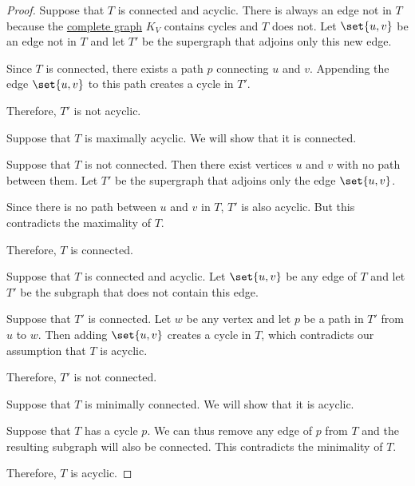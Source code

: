 \begin{proof}
   Suppose that \( T \) is connected and acyclic. There is always an edge not in \( T \) because the \hyperref[ex:complete_graph]{complete graph} \( K_V \) contains cycles and \( T \) does not. Let \( \set{ u, v } \) be an edge not in \( T \) and let \( T' \) be the supergraph that adjoins only this new edge.

  Since \( T \) is connected, there exists a path \( p \) connecting \( u \) and \( v \). Appending the edge \( \set{ u, v } \) to this path creates a cycle in \( T' \).

  Therefore, \( T' \) is not acyclic.

   Suppose that \( T \) is maximally acyclic. We will show that it is connected.

  Suppose that \( T \) is not connected. Then there exist vertices \( u \) and \( v \) with no path between them. Let \( T' \) be the supergraph that adjoins only the edge \( \set{ u, v } \).

  Since there is no path between \( u \) and \( v \) in \( T \), \( T' \) is also acyclic. But this contradicts the maximality of \( T \).

  Therefore, \( T \) is connected.

   Suppose that \( T \) is connected and acyclic. Let \( \set{ u, v } \) be any edge of \( T \) and let \( T' \) be the subgraph that does not contain this edge.

  Suppose that \( T' \) is connected. Let \( w \) be any vertex and let \( p \) be a path in \( T' \) from \( u \) to \( w \). Then adding \( \set{ u, v } \) creates a cycle in \( T \), which contradicts our assumption that \( T \) is acyclic.

  Therefore, \( T' \) is not connected.

   Suppose that \( T \) is minimally connected. We will show that it is acyclic.

  Suppose that \( T \) has a cycle \( p \). We can thus remove any edge of \( p \) from \( T \) and the resulting subgraph will also be connected. This contradicts the minimality of \( T \).

  Therefore, \( T \) is acyclic.


\end{proof}
